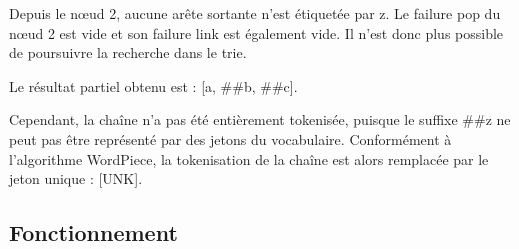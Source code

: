 \documentclass[12pt,a4paper]{report}
\begin{document}
\begin{figure} [H]
		
	\end{figure}
	
	Depuis le nœud 2, aucune arête sortante n'est étiquetée par z. Le failure pop du nœud 2 est vide et son failure link est également vide. Il n'est donc plus possible de poursuivre la recherche dans le trie.
	
	Le résultat partiel obtenu est : [a, \#\#b, \#\#c].
	
	Cependant, la chaîne n'a pas été entièrement tokenisée, puisque le suffixe \#\#z ne peut pas être représenté par des jetons du vocabulaire. Conformément à l'algorithme WordPiece, la tokenisation de la chaîne est alors remplacée par le jeton unique : [UNK].
	
	\subsection{Fonctionnement}
	
\end{document}
